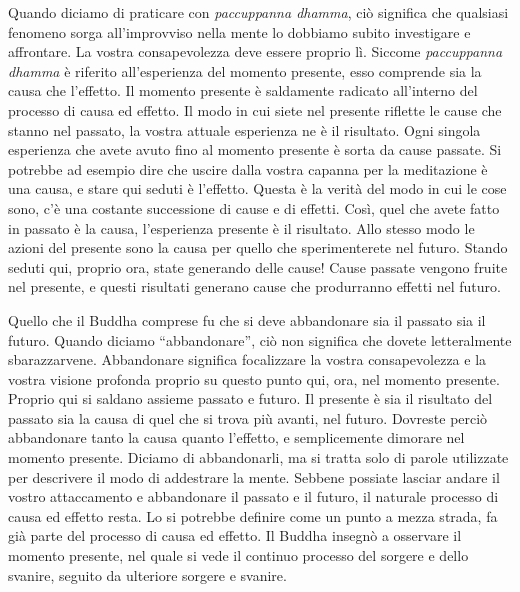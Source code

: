 Quando diciamo di praticare con \emph{paccuppanna dhamma}, ciò significa
che qualsiasi fenomeno sorga all'improvviso nella mente lo dobbiamo
subito investigare e affrontare. La vostra consapevolezza deve essere
proprio lì. Siccome \emph{paccuppanna dhamma} è riferito all'esperienza
del momento presente, esso comprende sia la causa che l'effetto. Il
momento presente è saldamente radicato all'interno del processo di causa
ed effetto. Il modo in cui siete nel presente riflette le cause che
stanno nel passato, la vostra attuale esperienza ne è il risultato. Ogni
singola esperienza che avete avuto fino al momento presente è sorta da
cause passate. Si potrebbe ad esempio dire che uscire dalla vostra
capanna per la meditazione è una causa, e stare qui seduti è l'effetto.
Questa è la verità del modo in cui le cose sono, c'è una costante
successione di cause e di effetti. Così, quel che avete fatto in passato
è la causa, l'esperienza presente è il risultato. Allo stesso modo le
azioni del presente sono la causa per quello che sperimenterete nel
futuro. Stando seduti qui, proprio ora, state generando delle cause!
Cause passate vengono fruite nel presente, e questi risultati generano
cause che produrranno effetti nel futuro.

Quello che il Buddha comprese fu che si deve abbandonare sia il passato
sia il futuro. Quando diciamo ``abbandonare'', ciò non significa che
dovete letteralmente sbarazzarvene. Abbandonare significa focalizzare la
vostra consapevolezza e la vostra visione profonda proprio su questo
punto qui, ora, nel momento presente. Proprio qui si saldano assieme
passato e futuro. Il presente è sia il risultato del passato sia la
causa di quel che si trova più avanti, nel futuro. Dovreste perciò
abbandonare tanto la causa quanto l'effetto, e semplicemente dimorare
nel momento presente. Diciamo di abbandonarli, ma si tratta solo di
parole utilizzate per descrivere il modo di addestrare la mente. Sebbene
possiate lasciar andare il vostro attaccamento e abbandonare il passato
e il futuro, il naturale processo di causa ed effetto resta. Lo si
potrebbe definire come un punto a mezza strada, fa già parte del
processo di causa ed effetto. Il Buddha insegnò a osservare il momento
presente, nel quale si vede il continuo processo del sorgere e dello
svanire, seguito da ulteriore sorgere e svanire.

